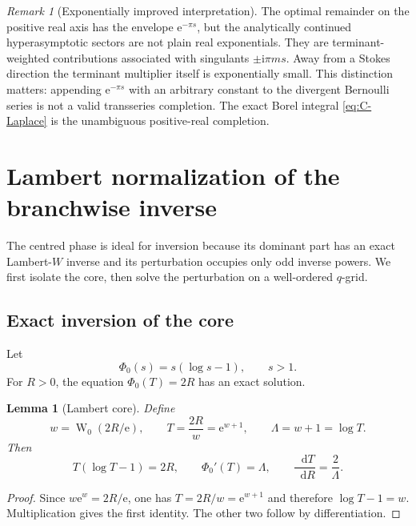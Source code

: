 \documentclass[11pt,a4paper,oneside]{article}
\theoremstyle{plain}
\newtheorem{lemma}[theorem]{Lemma}
\theoremstyle{definition}
\theoremstyle{remark}
\newtheorem{remark}[theorem]{Remark}
\newcommand{\e}{\mathrm e}
\newcommand{\dd}{\mathop{}\!\mathrm d}
\newcommand{\ii}{\mathrm i}
\newcommand{\W}{\operatorname W}
\begin{document}
\begin{remark}[Exponentially improved interpretation]
The optimal remainder on the positive real axis has the envelope
$\e^{-\pi s}$, but the analytically continued hyperasymptotic sectors are not
plain real exponentials.  They are terminant-weighted contributions associated
with singulants $\pm\ii\pi ms$.  Away from a Stokes direction the terminant
multiplier itself is exponentially small.  This distinction matters: appending
$\e^{-\pi s}$ with an arbitrary constant to the divergent Bernoulli series is
not a valid transseries completion.  The exact Borel integral
\cref{eq:C-Laplace} is the unambiguous positive-real completion.
\end{remark}

\section{Lambert normalization of the branchwise inverse}
\label{sec:lambert-core}

The centred phase is ideal for inversion because its dominant part has an
exact Lambert-$W$ inverse and its perturbation occupies only odd inverse powers.
We first isolate the core, then solve the perturbation on a well-ordered
$q$-grid.

\subsection{Exact inversion of the core}

Let
\begin{equation}
 \Phi_0(s)=s(\log s-1),\qquad s>1.
 \label{eq:core-phase}
\end{equation}
For $R>0$, the equation $\Phi_0(T)=2R$ has an exact solution.

\begin{lemma}[Lambert core]
\label{lem:lambert-core}
Define
\begin{equation}
 w=\W_0(2R/\e),
 \qquad T=\frac{2R}{w}=\e^{w+1},
 \qquad \Lambda=w+1=\log T.
 \label{eq:lambert-core}
\end{equation}
Then
\begin{equation}
 T(\log T-1)=2R,
 \qquad \Phi_0'(T)=\Lambda,
 \qquad \frac{\dd T}{\dd R}=\frac{2}{\Lambda}.
 \label{eq:core-identities}
\end{equation}
\end{lemma}

\begin{proof}
Since $w\e^w=2R/\e$, one has
$T=2R/w=\e^{w+1}$ and therefore $\log T-1=w$.  Multiplication gives the first
identity.  The other two follow by differentiation.
\end{proof}
\end{document}
